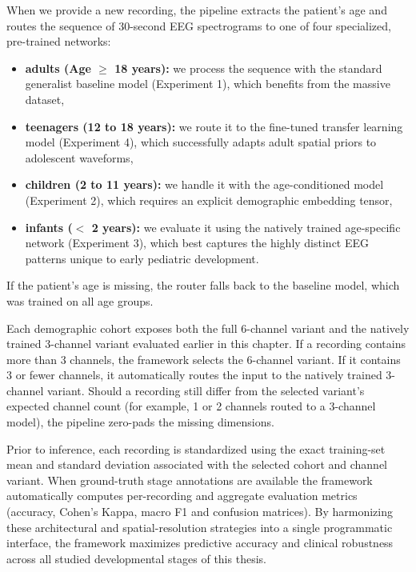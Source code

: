 When we provide a new recording, the pipeline extracts the patient's age and routes the sequence of 30-second
EEG spectrograms to one of four specialized, pre-trained networks:
\begin{itemize}
    \item \textbf{adults (Age $\geq$ 18 years):} we process the sequence with the standard generalist baseline model (Experiment 1), which benefits from the massive dataset,
    \item \textbf{teenagers (12 to 18 years):} we route it to the fine-tuned transfer learning model (Experiment 4), which successfully adapts adult spatial priors to adolescent waveforms,
    \item \textbf{children (2 to 11 years):} we handle it with the age-conditioned model (Experiment 2), which requires an explicit demographic embedding tensor,
    \item \textbf{infants ($<$ 2 years):} we evaluate it using the natively trained age-specific network (Experiment 3), which best captures the highly distinct EEG patterns unique to early pediatric development.
\end{itemize}
If the patient's age is missing, the router falls back to the baseline model, which was trained on all age groups.

Each demographic cohort exposes both the full 6-channel variant and the natively trained 3-channel variant evaluated earlier in this chapter. 
If a recording contains more than 3 channels, the framework selects the 6-channel variant. If it contains 3 or fewer channels, it automatically
routes the input to the natively trained 3-channel variant. Should a recording still differ from the selected variant's expected channel count
(for example, 1 or 2 channels routed to a 3-channel model), the pipeline zero-pads the missing dimensions.

Prior to inference, each recording is standardized using the exact training-set mean and standard deviation associated with the
selected cohort and channel variant. When ground-truth stage annotations are available the framework automatically computes per-recording and
aggregate evaluation metrics (accuracy, Cohen's Kappa, macro F1 and confusion matrices). By harmonizing these architectural and spatial-resolution
strategies into a single programmatic interface, the framework maximizes predictive accuracy and clinical robustness across all studied developmental stages of this thesis.
